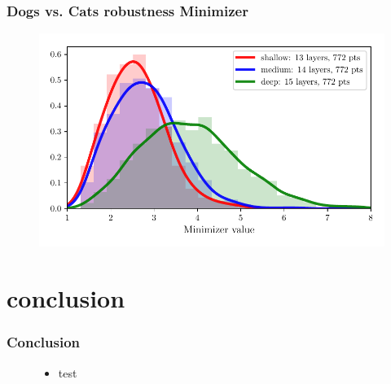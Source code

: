 \documentclass[handout]{beamer}
\begin{document}
\begin{frame}
\frametitle{Dogs vs. Cats robustness Minimizer} 
\begin{figure}
\includegraphics[width=0.9\linewidth]{../figures/plot_cats_vs_dogs_robustness_minimizer.pdf}
\end{figure}
\end{frame}

\section{conclusion}

\begin{frame}
\frametitle{Conclusion} 
\begin{figure}
\begin{itemize}
\item test
\end{itemize}
\end{figure}
\end{frame}
\end{document}
